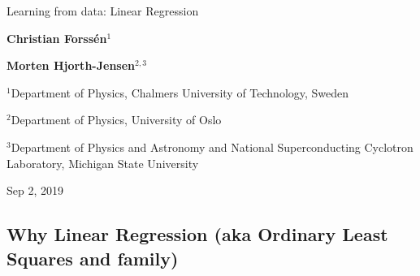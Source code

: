 \documentclass[%
oneside,                 %
final,                   %
10pt]{article}
\begin{document}

\newcommand{\exercisesection}[1]{\subsection*{#1}}







\thispagestyle{empty}

\begin{center}
{\LARGE\bf
\begin{spacing}{1.25}
Learning from data: Linear Regression
\end{spacing}
}
\end{center}


\begin{center}
{\bf Christian Forssén${}^{1}$} \\ [0mm]
\end{center}


\begin{center}
{\bf Morten Hjorth-Jensen${}^{2, 3}$} \\ [0mm]
\end{center}

\begin{center}
\centerline{{\small ${}^1$Department of Physics, Chalmers University of Technology, Sweden}}
\centerline{{\small ${}^2$Department of Physics, University of Oslo}}
\centerline{{\small ${}^3$Department of Physics and Astronomy and National Superconducting Cyclotron Laboratory, Michigan State University}}
\end{center}
    

\begin{center}
Sep 2, 2019
\end{center}

\vspace{1cm}


\subsection{Why Linear Regression (aka Ordinary Least Squares and family)}
\end{document}

